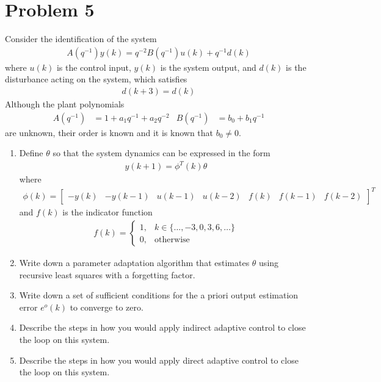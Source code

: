 \section*{Problem 5}

Consider the identification of the system
\begin{align*}
    A(q^{-1}) y(k) = q^{-2} B(q^{-1}) u(k) + q^{-1} d(k)
\end{align*}
where $u(k)$ is the control input, $y(k)$ is the system output, and $d(k)$ is the disturbance acting on the system, which satisfies
\begin{align*}
    d(k+3) = d(k)
\end{align*}
Although the plant polynomials
\begin{align*}
    A(q^{-1}) & = 1 + a_1 q^{-1} + a_2 q^{-2}
        & B(q^{-1}) & = b_0 + b_1 q^{-1}
\end{align*}
are unknown, their order is known and it is known that $b_0 \neq 0$.

\begin{enumerate}
    \item
    Define $\theta$ so that the system dynamics can be expressed in the form
    \begin{align*}
        y(k+1) = \phi^T(k) \theta
    \end{align*}
    where
    \begin{align*}
        \phi(k) = \begin{bmatrix}
                -y(k) & -y(k-1) & u(k-1) & u(k-2) & f(k) & f(k-1) & f(k-2)
            \end{bmatrix}^T
    \end{align*}
    and $f(k)$ is the indicator function
    \begin{align*}
        f(k) = \begin{cases}
                1, & k \in \{ \ldots, -3, 0, 3, 6, \ldots \} \\
                0, & \textrm{otherwise}
            \end{cases}
    \end{align*}

    \item
    Write down a parameter adaptation algorithm that estimates $\theta$ using recursive least squares with a forgetting factor.

    \item
    Write down a set of sufficient conditions for the a priori output estimation error $e^o(k)$ to converge to zero.

    \item
    Describe the steps in how you would apply indirect adaptive control to close the loop on this system.

    \item
    Describe the steps in how you would apply direct adaptive control to close the loop on this system.

\end{enumerate}
